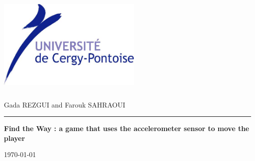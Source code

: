 \begin{titlepage}

\includegraphics   [width=7cm, height=5cm] {Logo_UCP.png} 

\begin{flushright}\LARGE
\color{bleu}
Gada REZGUI and Farouk SAHRAOUI
\end{flushright}
\hrule
\begin{flushleft}\huge\bfseries
\color{violet}
Find the Way : a game that uses the accelerometer sensor to move the player
\end{flushleft}


\begin{center}
 \large
\color{bleu}
\today



\end{center}

\end{titlepage}